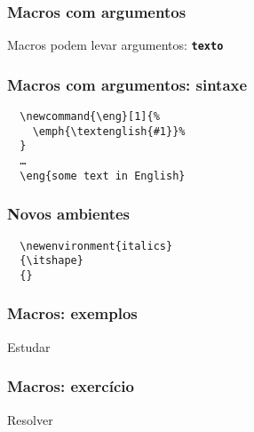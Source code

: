 {}

\begin{frame}
  \frametitle{Macros com argumentos}
  \LARGE
  Macros podem levar argumentos: \texttt{\textbf{texto}}
\end{frame}

\begin{frame}[fragile]
  \frametitle{Macros com argumentos: sintaxe}
  \begin{verbatim}
  \newcommand{\eng}[1]{%
    \emph{\textenglish{#1}}%
  }
  …
  \eng{some text in English}
  \end{verbatim}
\end{frame}

\begin{frame}[fragile]
  \frametitle{Novos ambientes}
  \begin{verbatim}
  \newenvironment{italics}
  {\itshape}
  {}
  \end{verbatim}
\end{frame}

\begin{frame}
  \frametitle{Macros: exemplos}
  \huge
  Estudar 
\end{frame}

\begin{frame}
  \frametitle{Macros: exercício}
  \huge
  Resolver 
\end{frame}

